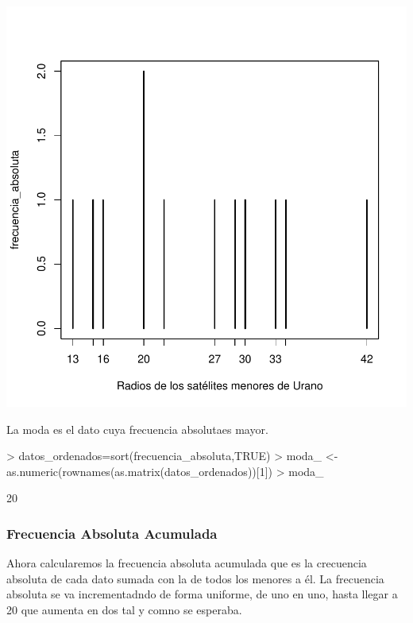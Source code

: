 \documentclass [a4paper] {article}
\begin{document}
\begin{Schunk}
\end{Schunk}
\begin{center}
\includegraphics{entrega-frecuencia_absoluta_satelites_plot}
\end{center}

La moda es el dato cuya frecuencia absolutaes mayor.
\begin{Schunk}
\begin{Sinput}
> datos_ordenados=sort(frecuencia_absoluta,TRUE)
> moda_ <- as.numeric(rownames(as.matrix(datos_ordenados))[1])
> moda_
\end{Sinput}
\begin{Soutput}
[1] 20
\end{Soutput}
\end{Schunk}

\subsubsection{Frecuencia Absoluta Acumulada}
Ahora calcularemos la frecuencia absoluta acumulada que es la crecuencia absoluta de cada dato sumada con la de todos los menores a él.
La frecuencia absoluta se va incrementadndo de forma uniforme, de uno en uno, hasta llegar a 20 que aumenta en dos tal y comno se esperaba.
\end{document}
